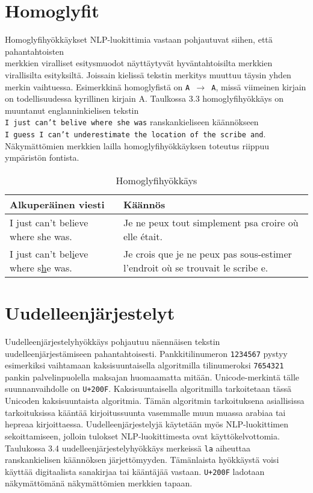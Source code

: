 \section{Homoglyfit}
Homoglyfihyökkäykset NLP-luokittimia vastaan pohjautuvat siihen, että pahantahtoisten\\ merkkien viralliset esitysmuodot näyttäytyvät hyväntahtoisilta merkkien virallisilta esityksiltä. Jois\-sain kielissä tekstin merkitys muuttuu täysin yhden merkin vaihtuessa. Esimerkkinä homoglyfistä on \texttt{A $\rightarrow$ A}, missä viimeinen kirjain on todellisuudessa kyrillinen kirjain A. Taulkossa 3.3 homoglyfihyökkäys on muuntanut englanninkielisen tekstin\\ \texttt{I just can't belive where she was} ranskankieliseen käännökseen\\ \texttt{I guess I can't underestimate the location of the scribe and}.\\
Näkymättömien merkkien lailla homoglyfihyökkäyksen toteutus riippuu ympäristön fontista. \citep{boucher2021bad}

\begin{table}[hbt]
  \caption{Homoglyfihyökkäys \citep{boucher2021bad}}
  \begin{tabular}{| l | m{20em} |}
    \hline
    Alkuperäinen viesti & Käännös\\
    \hline
    I just can't believe where she was. & Je ne peux tout simplement psa croire où elle était.\\
    \hline
    I \underline{j}ust can't bel\underline{i}eve where s\underline{h}e was. & Je crois que je ne peux pas sous-estimer l'endroit où se trouvait le scribe e.\\
    \hline
  \end{tabular}
\end{table}

\section{Uudelleenjärjestelyt}
Uudelleenjärjestelyhyökkäys pohjautuu näennäisen tekstin uudelleenjärjestämiseen pahantahtoisesti. Pankkitilinumeron \texttt{1234567} pystyy esimerkiksi vaihtamaan kaksisuuntaisella algoritmilla tilinumeroksi \texttt{7654321} pankin palvelinpuolella maksajan huomaamatta mitään. Unicode-merkintä tälle suunnanvaihdolle on \texttt{U+200F}. Kaksisuuntaisella algoritmilla tarkoitetaan tässä Unicoden kaksisuuntaista algoritmia. Tämän algoritmin tarkoituksena asiallisissa tarkoituksissa kääntää kirjoitussuunta vasemmalle muun muassa arabiaa tai hepreaa kirjoittaessa. Uudelleenjärjestelyjä käytetään myös NLP-luokittimen sekoittamiseen, jolloin tulokset NLP-luokittimesta ovat käyttökelvottomia. Taulukossa 3.4 uudelleenjärjestelyhyökkäys merkeissä \texttt{la} aiheuttaa ranskankielisen käännöksen järjettömyyden. Tämänlaista hyökkäystä voisi käyttää digitaalista sanakirjaa tai kääntäjää vastaan. \citep{boucher2021bad} \texttt{U+200F} ladotaan näkymättömänä näkymättömien merkkien tapaan.

